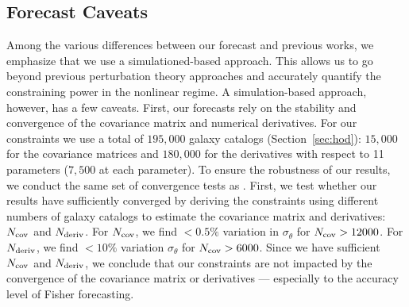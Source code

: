 \subsection{Forecast Caveats}
Among the various differences between our forecast and previous works, we
emphasize that we use a simulationed-based approach. This allows us to go beyond previous
perturbation theory approaches and accurately quantify the constraining power
in the nonlinear regime. A simulation-based approach, however, has a few caveats. 
First, our forecasts rely on the stability and convergence of the covariance 
matrix and numerical derivatives. 
For our constraints we use a total of $195,000$ galaxy catalogs (Section~\ref{sec:hod}): 
$15,000$ for the covariance matrices and $180,000$ for the derivatives with 
respect to 11 parameters ($7,500$ at each parameter). To ensure the robustness
of our results, we conduct the same set of convergence tests as
\cite{hahn2020}. 
First, we test whether our results have sufficiently converged by deriving the 
constraints using different numbers of galaxy catalogs to estimate the covariance 
matrix and derivatives: $N_{\rm cov}$ and $N_{\rm deriv}$. For $N_{\rm cov}$,
we find $< 0.5\%$ variation in $\sigma_\theta$ for $N_{\rm cov} > 12000$.
For $N_{\rm deriv}$, 
we find $< 10\%$ variation $\sigma_\theta$ for $N_{\rm cov} > 6000$.
Since we have sufficient $N_{\rm cov}$ and $N_{\rm deriv}$, we conclude that 
our constraints are not impacted by the convergence of the covariance matrix 
or derivatives --- especially to the accuracy level of Fisher forecasting. 

